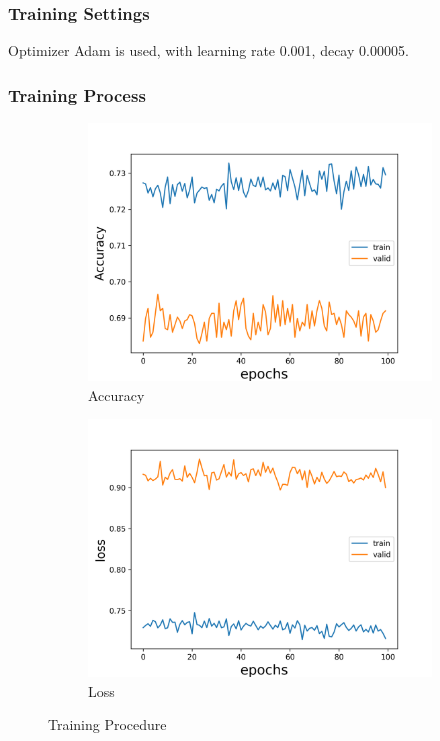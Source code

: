 \documentclass[fleqn,a4paper,12pt]{article}
\begin{document}
\subsubsection*{Training Settings}

Optimizer Adam is used, with learning rate 0.001, decay 0.00005.

\subsubsection*{Training Process}

\begin{figure}[h]
\centering
\begin{subfigure}{.5\textwidth}
  \centering
  \includegraphics[width=\linewidth]{report-imgs/accuracy.png}
  \caption{Accuracy}
  \label{fig:sub1}
\end{subfigure}%
\begin{subfigure}{.5\textwidth}
  \centering
  \includegraphics[width=\linewidth]{report-imgs/loss.png}
  \caption{Loss}
  \label{fig:sub2}
\end{subfigure}
\caption{Training Procedure}
\label{fig:test}
\end{figure}
\end{document}
